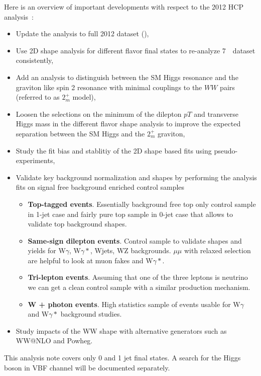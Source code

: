 Here is an overview of important developments with respect to the 2012 HCP
analysis~\cite{hwwhcp2012pas}:
\begin{itemize}
\item 
Update the analysis to full 2012 dataset (\intlumiEightTeV), 
\item 
Use 2D shape analysis for different flavor final states to re-analyze
7~\TeV\ dataset consistently, 
\item
Add an analysis to distinguish between the SM Higgs resonance and the graviton like 
spin 2 resonance with minimal couplings to the $WW$ pairs (referred to as $2_m^+$ model), 
\item 
Loosen the selections on the minimum of the dilepton $pT$ and transverse Higgs mass in the 
different flavor shape analysis to improve the expected separation between the SM Higgs and 
the $2_m^+$ graviton, 
\item 
Study the fit bias and stablitiy of the 2D shape based fits using pseudo-experiments, 
\item
Validate key background normalization and shapes by performing the analysis fits on signal 
free background enriched control samples
\begin{itemize}
  \item {\bf Top-tagged events}. Essentially background free top only
  control sample in 1-jet case and fairly pure top sample in 0-jet
  case that allows to validate top background shapes.  

  \item {\bf Same-sign dilepton events}. Control sample to validate
  shapes and yields for W$\gamma$, W$\gamma*$, Wjets, WZ
  backgrounds. $\mu\mu$ with relaxed selection are helpful to look at
  muon fakes and W$\gamma*$.
  
  \item {\bf Tri-lepton events}. Assuming that one of the three
  leptons is neutrino we can get a clean control sample with a similar
  production mechanism.

  \item {\bf W + photon events}. High statistics sample of events
  usable for W$\gamma$ and W$\gamma*$ background studies.
\end{itemize}
\item 
Study impacts of the WW shape with alternative generators such as WW@NLO and Powheg. 

\end{itemize}

This analysis note covers only 0 and 1 jet final states. A search for
the Higgs boson in VBF channel will be documented separately.
